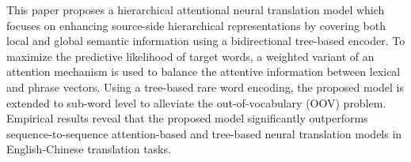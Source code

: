 This paper proposes a hierarchical attentional neural translation model which focuses on enhancing source-side hierarchical representations by covering both local and global semantic information using a bidirectional tree-based encoder. To maximize the predictive likelihood of target words, a weighted variant of an attention mechanism is used to balance the attentive information between lexical and phrase vectors. Using a tree-based rare word encoding, the proposed model is extended to sub-word level to alleviate the out-of-vocabulary (OOV) problem. Empirical results reveal that the proposed model significantly outperforms sequence-to-sequence attention-based and tree-based neural translation models in English-Chinese translation tasks.
